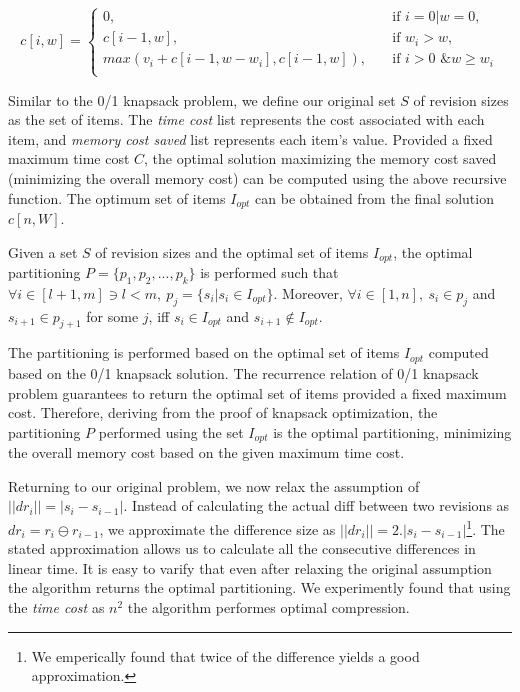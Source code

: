 \documentclass[acmsmall]{acmart}
\begin{document}
\begin{equation*}
c[i,w] = \begin{cases}
		 0, &\quad\text{if } i=0 | w=0,\\
		 c[i-1, w], &\quad\text{if } w_i>w,\\ 
       {\scriptstyle max(v_i+c[i-1, w-w_i],c[i-1,w])}, &\quad\text{if } i>0 \text{ \& } w\geq w_i\\
       	\end{cases}
\end{equation*}

Similar to the 0/1 knapsack problem, we define our original set $S$ of revision sizes as the set of items. The \emph{time cost} list represents the cost associated with each item, and \emph{memory cost saved} list represents each item's value. Provided a fixed maximum time cost $C$, the optimal solution maximizing the memory cost saved (minimizing the overall memory cost) can be computed using the above recursive function. The optimum set of items $I_{opt}$ can be obtained from the final solution $c[n,W]$.  

\begin{corollary}
Given a set $S$ of revision sizes and the optimal set of items $I_{opt}$, the optimal partitioning $P = \{p_1, p_2, ..., p_k\}$ is performed such that $\forall i \in [l+1, m] \ni l<m,\ p_j = \{s_i| s_i \in I_{opt}\}$. Moreover, $\forall i \in [1, n],\ s_i \in p_j$ and $s_{i+1} \in p_{j+1}$ for some $j$, iff $s_i \in I_{opt}$ and $s_{i+1} \notin I_{opt}$.
\end{corollary}

The partitioning is performed based on the optimal set of items $I_{opt}$ computed based on the 0/1 knapsack solution. The recurrence relation of 0/1 knapsack problem guarantees to return the optimal set of items provided a fixed maximum cost. Therefore, deriving from the proof of knapsack optimization, the partitioning $P$ performed using the set $I_{opt}$ is the optimal partitioning, minimizing the overall memory cost based on the given maximum time cost. 

Returning to our original problem, we now relax the assumption of $||dr_{i}|| = |s_i - s_{i-1}|$. Instead of calculating the actual diff between two revisions as $dr_i = r_{i} \ominus r_{i-1}$, we approximate the difference size as $||dr_{i}|| = 2 . |s_i - s_{i-1}|$\footnote{We emperically found that twice of the difference yields a good approximation.}. The stated approximation allows us to calculate all the consecutive differences in linear time. It is easy to varify that even after relaxing the original assumption the algorithm returns the optimal partitioning. We experimently found that using the \emph{time cost} as $n^2$ the algorithm performes optimal compression.
\end{document}
